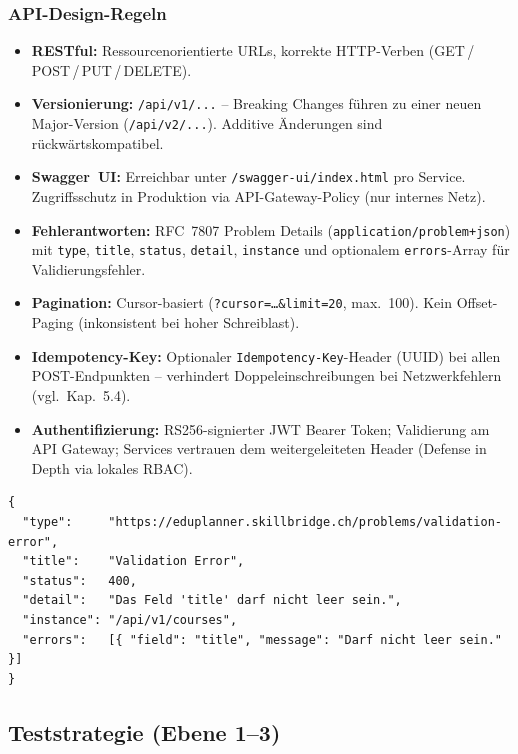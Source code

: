 \subsubsection{API-Design-Regeln}

\begin{itemize}[leftmargin=1.5em]
  \item \textbf{RESTful:} Ressourcenorientierte URLs, korrekte HTTP-Verben
  (GET\,/\,POST\,/\,PUT\,/\,DELETE).
  \item \textbf{Versionierung:} \texttt{/api/v1/...} --
  Breaking Changes führen zu einer neuen Major-Version
  (\texttt{/api/v2/...}). Additive Änderungen sind rückwärtskompatibel.
  \item \textbf{Swagger~UI:} Erreichbar unter
  \texttt{/swagger-ui/index.html} pro Service. Zugriffsschutz in
  Produktion via API-Gateway-Policy (nur internes Netz).
  \item \textbf{Fehlerantworten:} RFC~7807 Problem Details
  (\texttt{application/problem+json}) mit \texttt{type},
  \texttt{title}, \texttt{status}, \texttt{detail}, \texttt{instance}
  und optionalem \texttt{errors}-Array für Validierungsfehler.
  \item \textbf{Pagination:} Cursor-basiert
  (\texttt{?cursor=\ldots\&limit=20}, max.\ 100).
  Kein Offset-Paging (inkonsistent bei hoher Schreiblast).
  \item \textbf{Idempotency-Key:} Optionaler \texttt{Idempotency-Key}-Header
  (UUID) bei allen POST-Endpunkten -- verhindert Doppeleinschreibungen
  bei Netzwerkfehlern (vgl.\ Kap.~5.4).
  \item \textbf{Authentifizierung:} RS256-signierter JWT Bearer Token;
  Validierung am API Gateway; Services vertrauen dem weitergeleiteten
  Header (Defense in Depth via lokales RBAC).
\end{itemize}

\begin{hinweis}
\begin{lstlisting}
{
  "type":     "https://eduplanner.skillbridge.ch/problems/validation-error",
  "title":    "Validation Error",
  "status":   400,
  "detail":   "Das Feld 'title' darf nicht leer sein.",
  "instance": "/api/v1/courses",
  "errors":   [{ "field": "title", "message": "Darf nicht leer sein." }]
}
\end{lstlisting}
\end{hinweis}

\subsection{Teststrategie (Ebene 1--3)}

